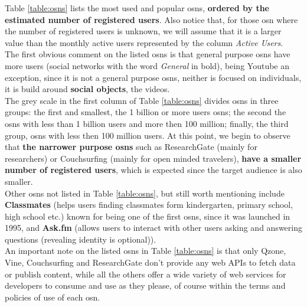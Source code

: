 \indent Table \ref{table:osns} lists the most used and popular \glspl{osn}, \textbf{ordered by the estimated number of registered users}.
Also notice that, for those \gls{osn} where the number of registered users is unknown, we will assume that it is a larger value than
the monthly active users represented by the column \textit{Active Users}.
\\
\indent The first obvious comment on the listed \glspl{osn} is that general purpose \glspl{osn} have more users (social
networks with the word \textit{General} in bold), being Youtube an exception, since it is not a general purpose \glspl{osn}, neither
is focused on individuals, it is build around \textbf{social objects}, the videos.
\\
\indent The grey scale in the first column of Table \ref{table:osns} divides \glspl{osn} in three groups: the first and smallest, the 1 billion
or more users \glspl{osn}; the second the \glspl{osn} with less than 1 billion users and more then 100 million; finally, the third group, \glspl{osn} with
less then 100 million users. At this point, we begin to observe that \textbf{the narrower purpose \glspl{osn}} such as ResearchGate (mainly for researchers) or
Couchsurfing (mainly for open minded travelers), \textbf{have a smaller number of registered users}, which is expected since the target audience is also smaller.
\\
\indent Other \glspl{osn} not listed in Table \ref{table:osns}, but still worth mentioning include \textbf{Classmates} (helps users finding
classmates form kindergarten, primary school, high school etc.) known for being one of the first \glspl{osn}, since it was
launched in 1995, and \textbf{Ask.fm} (allows users to interact with other users asking and answering questions (revealing identity is optional)).
\\
\indent An important note on the listed \glspl{osn} in Table \ref{table:osns} is that only Qzone, Vine, Couchsurfing and ResearchGate don't provide any web APIs
to fetch data or publish content, while all the others offer a wide variety of web services for developers to consume and use as they please, of course within the terms and policies
of use of each \gls{osn}.

